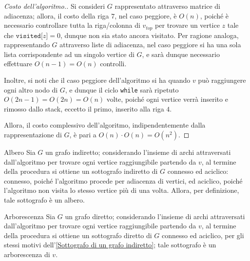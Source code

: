 \documentclass[a4paper, 12pt]{report}
\begin{document}
    \begin{proof}[Costo dell'algoritmo.]
        Si consideri $G$ rappresentato attraverso matrice di adiacenza; allora, il costo della riga $7$, nel caso peggiore, è $O(n)$, poiché è necessario controllare tutta la riga/colonna di $v_{top}$ per trovare un vertice $z$ tale che $\texttt{visited[}z\texttt{]} = 0$, dunque non sia stato ancora visitato. Per ragione analoga, rappresentando $G$ attraverso liste di adiacenza, nel caso peggiore si ha una sola lista corrispondente ad un singolo vertice di $G$, e sarà dunque necessario effettuare $O(n - 1) = O(n)$ controlli.

        Inoltre, si noti che il caso peggiore dell'algoritmo si ha quando $v$ può raggiungere ogni altro nodo di $G$, e dunque il ciclo \texttt{while} sarà ripetuto $O(2n - 1) = O(2n) = O(n)$ volte, poiché ogni vertice verrà inserito e rimosso dallo stack, eccetto il primo, inserito alla riga $4$.

        Allora, il costo complessivo dell'algoritmo, indipendentemente dalla rappresentazione di $G$, è pari a $O(n) \cdot O(n) = O(n^2)$.
    \end{proof}

    \begin{framedobs}{Albero}
        \label{Sottografo di un grafo indiretto}
        Sia $G$ un grafo indiretto; considerando l'insieme di archi attraversati dall'algoritmo per trovare ogni vertice raggiungibile partendo da $v$, al termine della procedura si ottiene un sottografo indiretto di $G$ connesso ed aciclico: connesso, poiché l'algoritmo procede per adiacenza di vertici, ed aciclico, poiché l'algoritmo non visita lo stesso vertice più di una volta. Allora, per definizione, tale sottografo è un albero.
    \end{framedobs}

    \begin{framedobs}{Arborescenza}
        Sia $G$ un grafo diretto; considerando l'insieme di archi attraversati dall'algoritmo per trovare ogni vertice raggiungibile partendo da $v$, al termine della procedura si ottiene un sottografo diretto di $G$ connesso ed aciclico, per gli stessi motivi dell'\cref{Sottografo di un grafo indiretto}; tale sottografo è un arborescenza di $v$.
    \end{framedobs}
\end{document}
